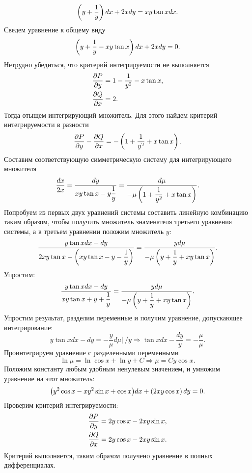         \[
            \left( y + \dfrac{1}{y} \right) dx + 2x dy = xy \tan{x} dx.
        \]
        Сведем уравнение к общему виду
        \[
            \left( y + \dfrac{1}{y} - xy \tan{x} \right) dx + 2x dy = 0.
        \]
        Нетрудно убедиться, что критерий интегрируемости не выполняется
        \[
            \begin{split}
                &\dfrac{\partial P}{\partial y} = 1 - \dfrac{1}{y^2} - x \tan{x}, \\
                &\dfrac{\partial Q}{\partial x} = 2.
            \end{split}
        \]
        Тогда отыщем интегрирующий множитель. Для этого найдем критерий интегрируемости в разности
        \[
            \dfrac{\partial P}{\partial y} - \dfrac{\partial Q}{\partial x} = -\left( 1 + \dfrac{1}{y^2} + x \tan{x} \right).
        \]
        Составим соответствующую симметрическую систему для интегрирующего множителя
        \[
            \dfrac{dx}{2x} = \dfrac{dy}{xy \tan{x} - y \dfrac{1}{y}} = \dfrac{d\mu}{-\mu \left( 1 + \dfrac{1}{y^2} + x \tan{x} \right)}.
        \]
        Попробуем из первых двух уравнений системы составить линейную комбинацию таким образом, чтобы получить множитель знаменателя третьего уравнения системы, а в третьем уравнении положим множитель $ y $:
        \[
            \dfrac{y \tan{x} dx - dy}{2xy \tan{x} - \left( xy\tan{x} - y - \dfrac{1}{y} \right)} = \dfrac{y d\mu}{-\mu \left( y + \dfrac{1}{y} + xy \tan{x} \right)}.
        \]
        Упростим:
        \[
            \dfrac{y \tan{x} dx - dy}{xy\tan{x} + y + \dfrac{1}{y}} = \dfrac{y d\mu}{-\mu \left( y + \dfrac{1}{y} + xy \tan{x} \right)}.
        \]
        Упростим результат, разделим переменные и получим уравнение, допускающее интегрирование:
        \[
            y \tan{x} dx - dy = -\dfrac{y}{\mu} d\mu \Bigg| ~ /y \Longrightarrow \tan{x} dx - \dfrac{dy}{y} = -\dfrac{\mu}{\mu}.
        \]
        Проинтегрируем уравнение с разделенными переменными
        \[
            \ln{\mu} = \ln{\cos{x}} + \ln{y} + C \Longrightarrow \mu = Cy \cos{x}.
        \]
        Положим константу любым удобным ненулевым значением, и умножим уравнение на этот множитель:
        \[
            \bigl( y^2\cos{x} - xy^2\sin{x} + \cos{x} \bigr) dx + \left( 2xy \cos{x} \right) dy = 0.
        \]
        Проверим критерий интегрируемости:
        \[
            \begin{split}
                &\dfrac{\partial P}{\partial y} = 2y \cos{x} - 2xy \sin{x}, \\
                &\dfrac{\partial Q}{\partial x} = 2y \cos{x} - 2xy \sin{x}.
            \end{split}
        \]
        Критерий выполняется, таким образом получено уравнение в полных дифференциалах.
